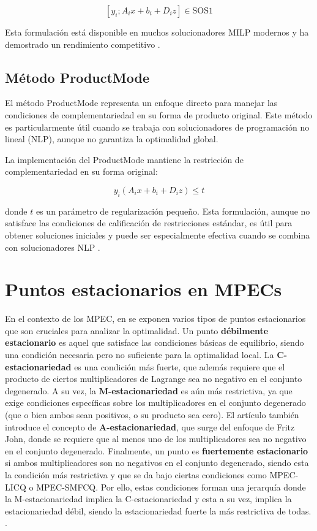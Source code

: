 \[ [y_i ; A_ix + b_i + D_iz] \in \text{SOS1} \]

Esta formulación está disponible en muchos solucionadores MILP modernos y ha demostrado un rendimiento competitivo \cite{BilevelJump}.

\subsection{Método ProductMode}

El método ProductMode representa un enfoque directo para manejar las condiciones de complementariedad en su forma de producto original. Este método es particularmente útil cuando se trabaja con solucionadores de programación no lineal (NLP), aunque no garantiza la optimalidad global.

La implementación del ProductMode mantiene la restricción de complementariedad en su forma original:

\[ y_i(A_ix + b_i + D_iz) \leq t \]

donde $t$ es un parámetro de regularización pequeño. Esta formulación, aunque no satisface las condiciones de calificación de restricciones estándar, es útil para obtener soluciones iniciales y puede ser especialmente efectiva cuando se combina con solucionadores NLP \cite{BilevelJump}.

\section{Puntos estacionarios en MPECs}
En el contexto de los MPEC, en \cite{Flegel2003AFJ} se exponen varios tipos de puntos estacionarios que son cruciales para analizar la optimalidad. Un punto \textbf{débilmente estacionario} es aquel que satisface las condiciones básicas de equilibrio, siendo una condición necesaria pero no suficiente para la optimalidad local. La \textbf{C-estacionariedad} es una condición más fuerte, que además requiere que el producto de ciertos multiplicadores de Lagrange sea no negativo en el conjunto degenerado. A su vez, la \textbf{M-estacionariedad} es aún más restrictiva, ya que exige condiciones específicas sobre los multiplicadores en el conjunto degenerado (que o bien ambos sean positivos, o su producto sea cero). El artículo también introduce el concepto de \textbf{A-estacionariedad}, que surge del enfoque de Fritz John, donde se requiere que al menos uno de los multiplicadores sea no negativo en el conjunto degenerado. Finalmente, un punto es \textbf{fuertemente estacionario} si ambos multiplicadores son no negativos en el conjunto degenerado, siendo esta la condición más restrictiva y que se da bajo ciertas condiciones como MPEC-LICQ o MPEC-SMFCQ. Por ello, estas condiciones forman una jerarquía donde la M-estacionariedad implica la C-estacionariedad y esta a su vez, implica la estacionariedad débil, siendo la estacionariedad fuerte la más restrictiva de todas. \cite{Flegel2003AFJ}.
